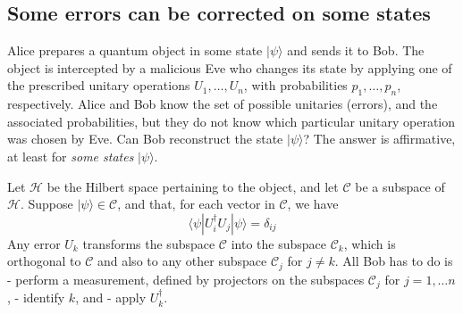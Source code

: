 \documentclass[fleqn]{article}
\begin{document}
\hypertarget{some-errors-can-be-corrected-on-some-states}{%
\subsection{Some errors can be corrected on some states}\label{some-errors-can-be-corrected-on-some-states}}

Alice prepares a quantum object in some state \(|\psi\rangle\) and sends it to Bob.
The object is intercepted by a malicious Eve who changes its state by applying one of the prescribed unitary operations \(U_1,\ldots, U_n\), with probabilities \(p_1,\ldots, p_n\), respectively.
Alice and Bob know the set of possible unitaries (errors), and the associated probabilities, but they do not know which particular unitary operation was chosen by Eve.
Can Bob reconstruct the state \(|\psi\rangle\)?
The answer is affirmative, at least for \emph{some states} \(|\psi\rangle\).

Let \(\mathcal{H}\) be the Hilbert space pertaining to the object, and let \(\mathcal{C}\) be a subspace of \(\mathcal{H}\).
Suppose \(|\psi\rangle\in\mathcal{C}\), and that, for each vector in \(\mathcal{C}\), we have
\[
  \langle\psi|U^\dagger_i U_j|\psi\rangle = \delta_{ij}
\]
Any error \(U_k\) transforms the subspace \(\mathcal{C}\) into the subspace \(\mathcal{C}_k\), which is orthogonal to \(\mathcal{C}\) and also to any other subspace \(\mathcal{C}_j\) for \(j\neq k\).
All Bob has to do is
- perform a measurement, defined by projectors on the subspaces \(\mathcal{C}_j\) for \(j=1,\ldots n\),
- identify \(k\), and
- apply \(U_k^\dagger\).
\end{document}
